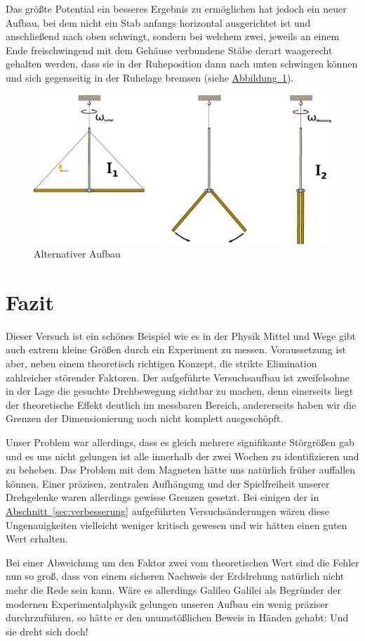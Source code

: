 \documentclass[halfparskip, 11pt]{scrartcl}
\newcommand{\hypref}[2]{\hyperref[#2]{{#1}~\ref{#2}}}
\begin{document}
Das größte Potential ein besseres Ergebnis zu ermöglichen hat jedoch ein neuer Aufbau, bei dem nicht ein Stab anfangs horizontal ausgerichtet ist und anschließend nach oben schwingt, sondern bei welchem zwei, jeweils an einem Ende freischwingend mit dem Gehäuse verbundene Stäbe derart waagerecht gehalten werden, dass sie in der Ruheposition dann nach unten schwingen können und sich gegenseitig in der Ruhelage bremsen (siehe \hypref{Abbildung}{prinzip2}).

\begin{figure}[ht]
\centering
\includegraphics[width=1.\textwidth]{prinzip-2.pdf}
\caption{Alternativer Aufbau}
\label{prinzip2}
\end{figure}



\newpage
\section{Fazit} %
Dieser Versuch ist ein schönes Beispiel wie es in der Physik Mittel und Wege gibt auch extrem kleine Größen durch ein Experiment zu messen.
Voraussetzung ist aber, neben einem theoretisch richtigen Konzept, die strikte Elimination zahlreicher störender Faktoren.
Der aufgeführte Versuchsaufbau ist zweifelsohne in der Lage die gesuchte Drehbewegung sichtbar zu machen, denn einerseits liegt der theoretische Effekt deutlich im messbaren Bereich, andererseits haben wir die Grenzen der Dimensionierung noch nicht komplett ausgeschöpft.

Unser Problem war allerdings, dass es gleich mehrere signifikante Störgrößen gab und es uns nicht gelungen ist alle innerhalb der zwei Wochen zu identifizieren und zu beheben.
Das Problem mit dem Magneten hätte uns natürlich früher auffallen können.
Einer präzisen, zentralen Aufhängung und der Spielfreiheit unserer Drehgelenke waren allerdings gewisse Grenzen gesetzt.
Bei einigen der in \hypref{Abschnitt}{sec:verbesserung} aufgeführten Versuchsänderungen wären diese Ungenauigkeiten vielleicht weniger kritisch gewesen und wir hätten einen guten Wert erhalten.

Bei einer Abweichung um den Faktor zwei vom theoretischen Wert sind die Fehler nun so groß, dass von einem sicheren Nachweis der Erddrehung natürlich nicht mehr die Rede sein kann.
Wäre es allerdings Galileo Galilei als Begründer der modernen Experimentalphysik gelungen unseren Aufbau ein wenig präziser durchrzuführen, so hätte er den unumstößlichen Beweis in Händen gehabt:
Und sie dreht sich doch!
\end{document}
